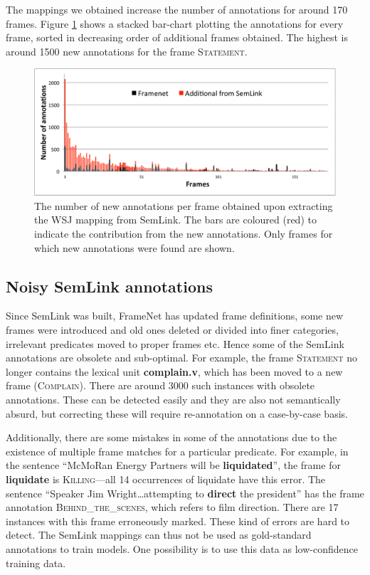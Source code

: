\documentclass[11pt]{article}
\newcommand{\vpred}[1]{\textbf{#1}} %
\newcommand{\fname}[1]{\textsc{#1}} %
\newcommand{\luname}[1]{\textbf{#1}} %
\begin{document}
The mappings we obtained increase the number of annotations for around 170 frames. Figure \ref{fig:framesBarchart} shows a stacked bar-chart plotting the annotations for every frame, sorted in decreasing order of additional frames obtained. The highest is around 1500 new annotations for the frame \fname{Statement}.
\begin{figure}\centering
\includegraphics[scale=0.5]{framesBarchart.pdf}
\caption{The number of new annotations per frame obtained upon extracting the WSJ mapping from SemLink. The bars are coloured (red) to indicate the contribution from the new annotations. Only frames for which new annotations were found are shown.}
\label{fig:framesBarchart}
\end{figure}

\subsection{Noisy SemLink annotations}
Since SemLink was built, FrameNet has updated frame definitions, some new frames were introduced and old ones deleted or divided into finer categories, irrelevant predicates moved to proper frames etc. Hence some of the SemLink annotations are obsolete and sub-optimal. 
For example, the frame \fname{Statement} no longer contains the lexical unit \luname{complain.v}, which has been moved to a new frame (\fname{Complain}). There are around 3000 such instances with obsolete annotations. These can be detected easily and they are also not semantically absurd, but correcting these will require re-annotation on a case-by-case basis.

Additionally, there are some mistakes in some of the annotations due to the existence of multiple frame matches for a particular predicate. 
For example, in the sentence ``McMoRan Energy Partners will be \vpred{liquidated}'', 
the frame for \vpred{liquidate} is \fname{Killing}---all 14 occurrences of liquidate have this error. 
The sentence ``Speaker Jim Wright\ldots attempting to \vpred{direct} the president'' has the frame annotation \fname{Behind\_the\_scenes}, 
which refers to film direction. There are 17 instances with this frame erroneously marked. These kind of errors are hard to detect. 
The SemLink mappings can thus not be used as gold-standard annotations to train models. One possibility is to use this data as low-confidence training data.
\end{document}
